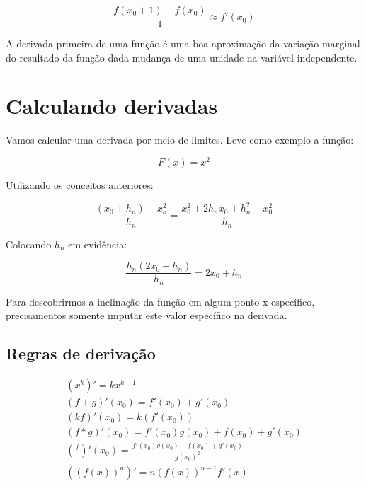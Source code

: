 \documentclass[12pt,a4paper,oneside,brazil]{abntex2}
\begin{document}
\[ \frac{f (x_0 + 1) - f (x_0)}{1} \approx f'(x_0) \]

A derivada primeira de uma função é uma boa aproximação da variação marginal do resultado da função dada mudança de uma unidade na variável independente.

\section{Calculando derivadas}
Vamos calcular uma derivada por meio de limites. Leve como exemplo a função:

\[  F (x) = x^2 \]

Utilizando os conceitos anteriores:

\[ \frac{ (x_0 + h_n) - x_o^2}{h_n} = \frac{x_0^2 + 2 h _n x_0 + h_n^2 -x_0^2}{h_n} \]

Colocando $h_n$ em evidência:

\[ \frac{h_n (2 x_0 + h_n)}{h_n} = 2 x_0 + h_n \]

Para descobrirmos a inclinação da função em algum ponto x específico, precisamentos somente imputar este valor específico na derivada.

\subsection{Regras de derivação}

\begin{align}
(x^k)'= k x^{k - 1}\\
(f + g)' (x_0) = f'(x_0) + g'(x_0)\\ 
(k f)'(x_0) = k (f'(x_0))\\
(f * g)'(x_0) = f'(x_0) g(x_0) + f(x_0) + g'(x_0)\\ 
(\frac{f}{})' (x_0) = \frac{f'(x_0) g(x_0) - f(x_0) + g'(x_0)}{g (x_0)^2}\\
((f (x))^n)'= n (f(x))^{n - 1} f'(x)\\
\end{align}


\printbibliography
\end{document}
